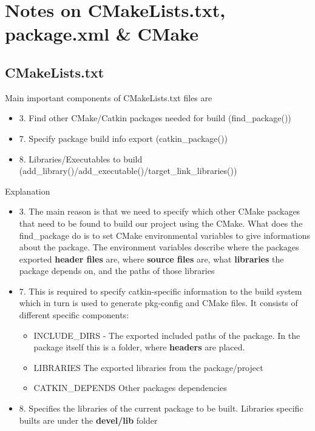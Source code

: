 \documentclass[11pt,a4paper]{article}
\begin{document}
\section{Notes on CMakeLists.txt, package.xml \& CMake} \label{sec:cmake}

\subsection{CMakeLists.txt} \label{sec:cmake_list}
Main important components of CMakeLists.txt files are
\begin{itemize}
\item 3. Find other CMake/Catkin packages needed for build (find{\_}package())
\item 7. Specify package build info export (catkin{\_}package())
\item 8. Libraries/Executables to build (add{\_}library()/add{\_}executable()/target{\_}link{\_}libraries()) 
\end{itemize}


Explanation
\begin{itemize}
\item 3. The main reason is that we need to specify which other CMake packages that need to be found to build our project using the CMake. What does the find{\_}package do is to set CMake environmental variables to give informations about the package. The environment variables describe where the packages exported \textbf{header files} are, where \textbf{source files} are, what \textbf{libraries} the package depends on, and the paths of those libraries
\item 7. This is required to specify catkin-specific information to the build system which in turn is used to generate pkg-config and CMake files. It consists of different specific components:
\begin{itemize}
\item INCLUDE{\_}DIRS - The exported included paths of the package. In the package itself this is a folder, where \textbf{headers} are placed. 
\item LIBRARIES The exported libraries from the package/project
\item CATKIN{\_}DEPENDS Other packages dependencies 
\end{itemize}
\item 8. Specifies the libraries of the current package to be built. Libraries specific builts are under the \textbf{devel/lib} folder
\end{itemize}
\end{document}
